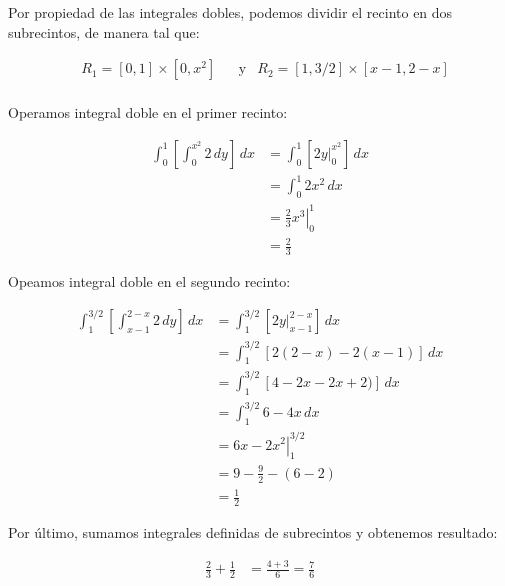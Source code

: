 Por propiedad de las integrales dobles,
podemos dividir el recinto en dos subrecintos, 
de manera tal que:

\begin{align*}
    &R_1 = [0,1] \times [0,x^{2}] &&\text{y} &R_2 = [1,3/2] \times [x-1,2-x] \\ %
\end{align*}

Operamos integral doble en el primer recinto: 

\begin{align*}
    \int_{0}^{1}\!\left[\int_{0}^{x^{2}}2\,dy\right]\,dx &= \int_{0}^{1}\!\left[\left.2y\right|_{0}^{x^{2}}\right]\,dx \\
    & = \int_{0}^{1} 2x^{2}\,dx \\ 
    & = \left.\frac{2}{3}x^{3}\right|_{0}^{1} \\
    & = \boxed{\frac{2}{3}}
\end{align*}

Opeamos integral doble en el segundo recinto: 

\begin{align*}
    \int_{1}^{3/2}\left[\int_{x-1}^{2-x} 2\,dy\right]\,dx &= \int_{1}^{3/2}\left[\left.2y\right|_{x-1}^{2-x}\right]\,dx \\
    &= \int_{1}^{3/2}\left[2(2-x) - 2(x-1)\right]\,dx \\
    &= \int_{1}^{3/2}\left[4-2x - 2x + 2)\right]\,dx \\
    &= \int_{1}^{3/2}6-4x\,dx \\
    &= \left.6x - 2x^{2}\right|_{1}^{3/2} \\
    &= 9 - \frac{9}{2} - (6 - 2) \\
    &= \boxed{\frac{1}{2}}
\end{align*}

Por último,
sumamos integrales definidas de subrecintos y obtenemos resultado:

\begin{align*}
    \frac{2}{3} + \frac{1}{2} & = \frac{4 + 3}{6} = \boxed{\frac{7}{6}}
\end{align*}
